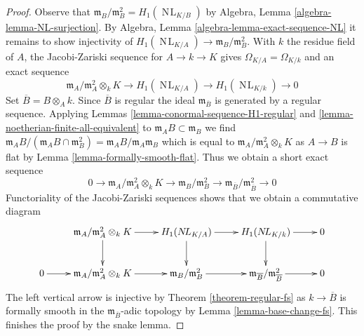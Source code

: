 \documentclass[10pt,a4paper]{amsart}
\theoremstyle{plain}
\theoremstyle{definition}
\theoremstyle{remark}
\numberwithin{equation}{subsection}
\def\NL{\mathop{N\!L}\nolimits}
\begin{document}
\begin{proof}
Observe that $\mathfrak m_B/\mathfrak m_B^2 = H_1(\NL_{K/B})$
by Algebra, Lemma \ref{algebra-lemma-NL-surjection}.
By Algebra, Lemma \ref{algebra-lemma-exact-sequence-NL}
it remains to show injectivity of
$H_1(\NL_{K/A}) \to \mathfrak m_B/\mathfrak m_B^2$.
With $k$ the residue field of $A$, the Jacobi-Zariski sequence
for $A \to k \to K$ gives $\Omega_{K/A} = \Omega_{K/k}$ and
an exact sequence
$$
\mathfrak m_A/\mathfrak m_A^2 \otimes_k K \to
H_1(\NL_{K/A}) \to
H_1(\NL_{K/k}) \to 0
$$
Set $\overline{B} = B \otimes_A k$. Since $\overline{B}$ is
regular the ideal $\mathfrak m_{\overline{B}}$ is generated
by a regular sequence. Applying
Lemmas \ref{lemma-conormal-sequence-H1-regular} and
\ref{lemma-noetherian-finite-all-equivalent}
to $\mathfrak m_A B \subset \mathfrak m_B$
we find $\mathfrak m_A B / (\mathfrak m_AB \cap \mathfrak m_B^2) =
\mathfrak m_A B / \mathfrak m_A \mathfrak m_B$ which is
equal to $\mathfrak m_A/\mathfrak m_A^2 \otimes_k K$
as $A \to B$ is flat by Lemma \ref{lemma-formally-smooth-flat}.
Thus we obtain a short exact sequence
$$
0 \to
\mathfrak m_A/\mathfrak m_A^2 \otimes_k K \to
\mathfrak m_B/\mathfrak m_B^2 \to
\mathfrak m_{\overline{B}}/\mathfrak m_{\overline{B}}^2 \to 0
$$
Functoriality of the Jacobi-Zariski sequences shows that
we obtain a commutative diagram
$$
\xymatrix{
&
\mathfrak m_A/\mathfrak m_A^2 \otimes_k K \ar[d] \ar[r] &
H_1(\NL_{K/A}) \ar[d] \ar[r] &
H_1(\NL_{K/k}) \ar[d] \ar[r] & 0 \\
0 \ar[r] &
\mathfrak m_A/\mathfrak m_A^2 \otimes_k K \ar[r] &
\mathfrak m_B/\mathfrak m_B^2 \ar[r] &
\mathfrak m_{\overline{B}}/\mathfrak m_{\overline{B}}^2 \ar[r] & 0
}
$$
The left vertical arrow is injective by Theorem \ref{theorem-regular-fs}
as $k \to \overline{B}$ is formally smooth in
the $\mathfrak m_{\overline{B}}$-adic topology by
Lemma \ref{lemma-base-change-fs}.
This finishes the proof by the snake lemma.
\end{proof}
\end{document}
